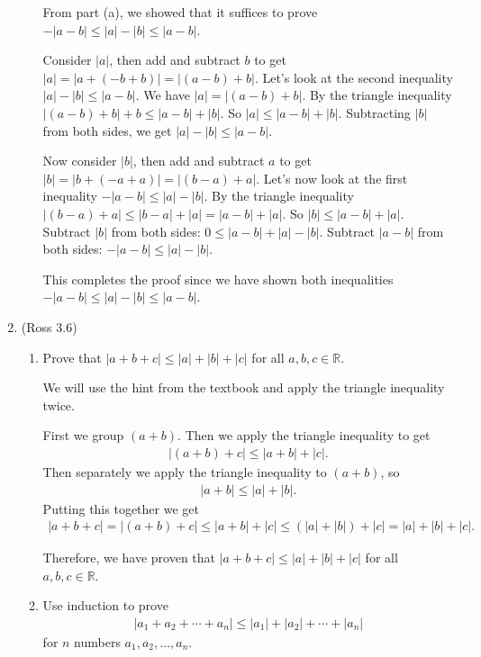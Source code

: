 \documentclass [10pt]{article}
\newcommand{\jg}[1]{{\color{blue} #1}}
\begin{document}
\begin{enumerate}
\begin{enumerate}
\jg{
From part (a), we showed that it suffices to prove $-|a-b| \leq |a| - |b| \leq |a-b|$. 

Consider $|a|$, then add and subtract $b$ to get $|a| = |a + (-b + b)| = |(a-b) + b|$. Let's look at the second inequality $|a| - |b| \leq |a-b|$. We have $|a| = |(a-b) + b|$. By the triangle inequality $|(a-b) + b| + b \leq |a-b| + |b|$. So $|a| \leq |a-b| + |b|$. Subtracting $|b|$ from both sides, we get $|a| - |b| \leq |a-b|$. 

Now consider $|b|$, then add and subtract $a$ to get $|b| = |b + (-a + a)| = |(b-a) + a|$. Let's now look at the first inequality $-|a-b| \leq |a| - |b|$. By the triangle inequality $|(b-a) + a| \leq |b-a| + |a| = |a-b| + |a|$. So $|b| \leq |a-b| + |a|$. Subtract $|b|$ from both sides: $0 \leq |a-b| + |a| - |b|$. Subtract $|a-b|$ from both sides: $-|a-b| \leq |a| - |b|$.

This completes the proof since we have shown both inequalities $-|a-b| \leq |a| - |b| \leq |a-b|$. 
}
\end{enumerate}
\clearpage
\item (Ross 3.6)
\begin{enumerate}
\item Prove that $|a+b+c| \leq |a|+|b|+|c|$ for all $a, b, c \in \mathbb{R}
$.

\jg{
We will use the hint from the textbook and apply the triangle inequality twice. 

First we group $(a+b)$. Then we apply the triangle inequality to get
\begin{align*}
    |(a+b) + c| \leq |a + b| + |c|.
\end{align*}
Then separately we apply the triangle inequality to $(a+b)$, so 
\begin{align*}
    |a+b| \leq |a| + |b|. 
\end{align*}
Putting this together we get 
\begin{align*}
    |a+b+c| = |(a+b) + c| \leq |a+b| +|c| \leq (|a| + |b|) + |c| = |a| + |b| + |c|. 
\end{align*}

Therefore, we have proven that $|a+b+c| \leq |a|+|b|+|c|$ for all $a, b, c \in \mathbb{R}$. \\
}

\item Use induction to prove
\begin{align*}
|a_1+a_2 + \cdots + a_n| \leq |a_1|+|a_2|+ \cdots + |a_n|
\end{align*}
for $n$ numbers $a_1, a_2, ..., a_n$.


\end{enumerate}
\end{enumerate}
\end{document}
